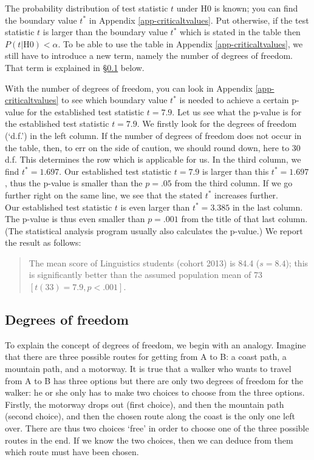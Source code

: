 \documentclass[
]{book}
\begin{document}
The probability distribution of test statistic \(t\) under H0 is known;
you can find the boundary value \(t^*\) in
Appendix \ref{app-criticaltvalues}. Put otherwise, if the test statistic \(t\)
is larger than the boundary value \(t^*\) which is stated in the table then
\(P(t|\textrm{H0})<\alpha\). To be able to use the table in Appendix
\ref{app-criticaltvalues}, we still have to introduce a new term,
namely the number of degrees of freedom. That term is
explained in
§\ref{sec:ttest-freedomdegrees} below.

With the number of degrees of freedom, you can look in Appendix
\ref{app-criticaltvalues} to see which boundary value \(t^*\) is needed
to achieve a certain p-value for the established test statistic
\(t=7.9\). Let us see what the p-value is for the established
test statistic \(t=7.9\). We firstly look for the degrees of freedom (`d.f.') in the left column.
If the number of degrees of freedom does not occur in the table, then, to err
on the side of caution, we should round down, here to 30 d.f. This determines the row
which is applicable for us. In the third column, we find \(t^*=1.697\). Our
established test statistic \(t=7.9\) is larger than this \(t^*=1.697\), thus the p-value
is smaller than the \(p=.05\) from the third column. If we go further right on
the same line, we see that the stated \(t^*\) increases further.\\
Our established test statistic \(t\) is even larger than \(t^*=3.385\) in the last column.
The p-value is thus even smaller than \(p=.001\) from the title of that last
column. (The statistical analysis program usually also calculates the p-value.)
We report the result as follows:

\begin{quote}
The mean score of Linguistics students (cohort 2013) is
84.4 (\(s=8.4\)); this is significantly better than the assumed
population mean of 73 \([t(33)=7.9, p<.001]\).
\end{quote}

\hypertarget{sec:ttest-freedomdegrees}{%
\subsection{Degrees of freedom}\label{sec:ttest-freedomdegrees}}

To explain the concept of degrees of freedom, we begin with an
analogy. Imagine that there are three possible routes for getting
from A to B: a coast path, a mountain path, and a motorway. It is true that a walker
who wants to travel from A to B has three options but there are only
two degrees of freedom for the walker: he or she only has to make
two choices to choose from the three options. Firstly, the motorway drops out
(first choice), and then the mountain path (second choice),
and then the chosen route along the coast is the only one left over. There are thus two
choices `free' in order to choose one of the three possible routes in the end.
If we know the two choices, then we can deduce from them which
route must have been chosen.
\end{document}
